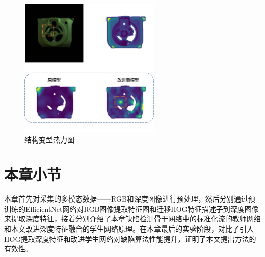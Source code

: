 \begin{figure}[htbp]
    \centering
    \includegraphics[width=0.6\textwidth]{figures/4/featmap-2.png}
    \caption{结构变型热力图}
    \label{fig:featmap-2}
\end{figure}


\section{本章小节}
本章首先对采集的多模态数据——RGB和深度图像进行预处理，然后分别通过预训练的EfficientNet网络对RGB图像提取特征图和迁移HOG特征描述子到深度图像来提取深度特征，接着分别介绍了本章缺陷检测骨干网络中的标准化流的教师网络和本文改进深度特征融合的学生网络原理。在本章最后的实验阶段，对比了引入HOG提取深度特征和改进学生网络对缺陷算法性能提升，证明了本文提出方法的有效性。

















    
